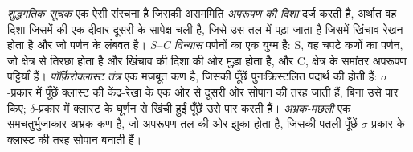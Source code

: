 \begin{definition}[शुद्धगतिक सूचक]\label{def:b3:deformation-mechanisms:kinematic}
\emph{शुद्धगतिक सूचक} एक ऐसी संरचना है जिसकी
असममिति \emph{अपरूपण की दिशा} दर्ज करती है, अर्थात वह दिशा जिसमें
 की एक दीवार दूसरी के सापेक्ष चली है,
जिसे उस तल में पढ़ा जाता है जिसमें खिंचाव-रेखन होता है और जो पर्णन के लंबवत है।
\emph{S--C विन्यास} पर्णनों का एक युग्म है: S, वह
चपटे कणों का पर्णन, जो क्षेत्र से तिरछा होता है और
खिंचाव की दिशा की ओर मुड़ा होता है, और C, क्षेत्र के समांतर अपरूपण पट्टियाँ हैं।
\emph{पॉर्फ़िरोक्लास्ट तंत्र} एक मज़बूत कण है, जिसकी पूँछें
पुनःक्रिस्टलित पदार्थ की होती हैं: $\sigma$-प्रकार में पूँछें क्लास्ट की केंद्र-रेखा के
एक ओर से दूसरी ओर सोपान की तरह जाती हैं, बिना उसे पार किए; $\delta$-प्रकार में
क्लास्ट के घूर्णन से खिंची हुईं पूँछें उसे पार करती हैं।
\emph{अभ्रक-मछली} एक समचतुर्भुजाकार अभ्रक कण है, जो
अपरूपण तल की ओर झुका होता है, जिसकी पतली पूँछें $\sigma$-प्रकार के क्लास्ट की तरह सोपान बनाती हैं।
\end{definition}

